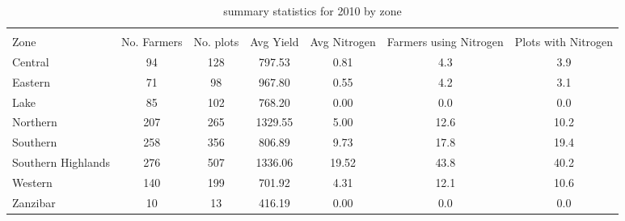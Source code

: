 \documentclass{article}
\begin{document}
\begin{table}
	\caption{summary statistics for 2010 by zone}
	\label{}
\begin{tabular}{@{\extracolsep{5pt}}lcccccc}
\\[-1.8ex]\hline 
\hline \\[-1.8ex]
Zone & \multicolumn{1}{c}{No. Farmers} & \multicolumn{1}{c}{No. plots} & \multicolumn{1}{c}{Avg Yield} & \multicolumn{1}{c}{Avg Nitrogen} & \multicolumn{1}{c}{Farmers using Nitrogen} &\multicolumn{1}{c}{Plots with Nitrogen} \\
\hline
Central & 94 & 128 & 797.53 & 0.81 & 4.3 & 3.9 \\
Eastern & 71 & 98 & 967.80 & 0.55 & 4.2 & 3.1 \\
Lake & 85 & 102 & 768.20 & 0.00 & 0.0 & 0.0 \\
Northern & 207 & 265 & 1329.55 & 5.00 & 12.6 & 10.2 \\
Southern & 258 & 356 & 806.89 & 9.73 & 17.8 & 19.4 \\
Southern Highlands & 276 & 507 & 1336.06 & 19.52 & 43.8 & 40.2 \\
Western & 140 & 199 & 701.92 & 4.31 & 12.1 & 10.6 \\
Zanzibar & 10 & 13 & 416.19 & 0.00 & 0.0 & 0.0 \\
\hline
\end{tabular}
\end{table}
\end{document}
